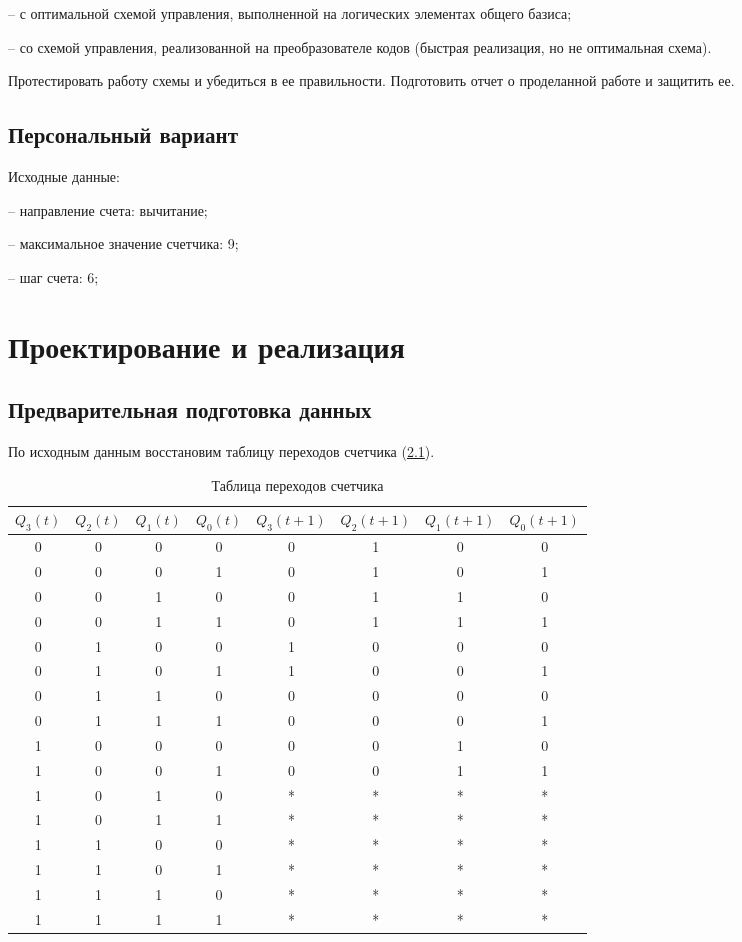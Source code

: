 \documentclass[14pt, a4paper]{extreport}
\begin{document}
-- с оптимальной схемой управления, выполненной на логических элементах общего базиса;

-- со схемой управления, реализованной на преобразователе кодов (быстрая реализация, но не оптимальная схема).

Протестировать работу схемы и убедиться в ее правильности. Подготовить отчет о проделанной работе и защитить ее.

\section{Персональный вариант}
Исходные данные:

-- направление счета: вычитание;

-- максимальное значение счетчика: 9;

-- шаг счета: 6;

\chapter{Проектирование и реализация}
\section{Предварительная подготовка данных}
По исходным данным восстановим таблицу переходов счетчика (\cref{tab:states}).

\begin{table}[H]
	\caption{Таблица переходов счетчика}
	\label{tab:states}
	\begin{tabular}{|c|c|c|c|c|c|c|c|}
		\hline
		$Q_3(t)$ & $Q_2(t)$ & $Q_1(t)$ & $Q_0(t)$ & $Q_3(t + 1)$ & $Q_2(t + 1)$ & $Q_1(t + 1)$ & $Q_0(t + 1)$ \\
		\hline
		0 & 0 & 0 & 0 & 0 & 1 & 0 & 0 \\
		\hline
		0 & 0 & 0 & 1 & 0 & 1 & 0 & 1 \\
		\hline
		0 & 0 & 1 & 0 & 0 & 1 & 1 & 0 \\
		\hline
		0 & 0 & 1 & 1 & 0 & 1 & 1 & 1 \\
		\hline
		0 & 1 & 0 & 0 & 1 & 0 & 0 & 0 \\
		\hline
		0 & 1 & 0 & 1 & 1 & 0 & 0 & 1 \\
		\hline
		0 & 1 & 1 & 0 & 0 & 0 & 0 & 0 \\
		\hline
		0 & 1 & 1 & 1 & 0 & 0 & 0 & 1 \\
		\hline
		1 & 0 & 0 & 0 & 0 & 0 & 1 & 0 \\
		\hline
		1 & 0 & 0 & 1 & 0 & 0 & 1 & 1 \\
		\hline
		1 & 0 & 1 & 0 & * & * & * & * \\
		\hline
		1 & 0 & 1 & 1 & * & * & * & * \\
		\hline
		1 & 1 & 0 & 0 & * & * & * & * \\
		\hline
		1 & 1 & 0 & 1 & * & * & * & * \\
		\hline
		1 & 1 & 1 & 0 & * & * & * & * \\
		\hline
		1 & 1 & 1 & 1 & * & * & * & * \\
		\hline
	\end{tabular}
\end{table}
\end{document}
